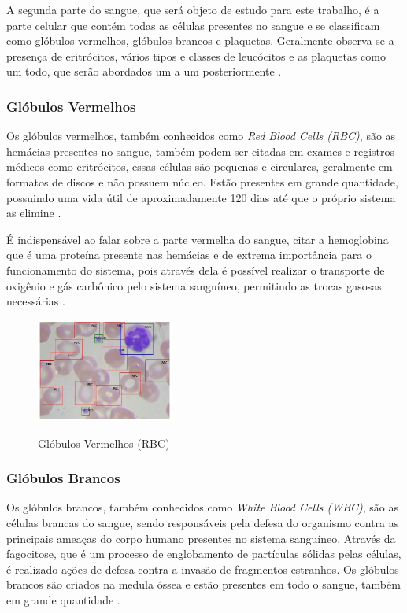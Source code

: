 A segunda parte do sangue, que será objeto de estudo para este trabalho, é a parte celular que contém todas as células presentes no sangue e se classificam como glóbulos vermelhos, glóbulos brancos e plaquetas. Geralmente observa-se a presença de eritrócitos, vários tipos e classes de leucócitos e as plaquetas como um todo, que serão abordados um a um posteriormente \cite{manualHematologia}.

\subsubsection{Glóbulos Vermelhos}
Os glóbulos vermelhos, também conhecidos como \emph{Red Blood Cells (RBC)}, são as hemácias presentes no sangue, também podem ser citadas em exames e registros médicos como eritrócitos, essas células são pequenas e circulares, geralmente em formatos de discos e não possuem núcleo. Estão presentes em grande quantidade, possuindo uma vida útil de aproximadamente 120 dias até que o próprio sistema as elimine \cite{manualHematologia}.

É indispensável ao falar sobre a parte vermelha do sangue, citar a hemoglobina que é uma proteína presente nas hemácias e de extrema importância para o funcionamento do sistema, pois através dela é possível realizar o transporte de oxigênio e gás carbônico pelo sistema sanguíneo, permitindo as trocas gasosas necessárias \cite{manualHematologia}.

\begin{figure}[!htb]
    \centering
    \caption{Glóbulos Vermelhos (RBC)}
    \includegraphics[width=0.40\textwidth]{img/rbc.jpg}
    \label{fig:rbc}
 \end{figure}
 
\subsubsection{Glóbulos Brancos}
Os glóbulos brancos, também conhecidos como \emph{White Blood Cells (WBC)}, são as células brancas do sangue, sendo responsáveis pela defesa do organismo contra as principais ameaças do corpo humano presentes no sistema sanguíneo. Através da fagocitose, que é um processo de englobamento de partículas sólidas pelas células, é realizado ações de defesa contra a invasão de fragmentos estranhos. Os glóbulos brancos são criados na medula óssea e estão presentes em todo o sangue, também em grande quantidade \cite{manualHematologia}.

